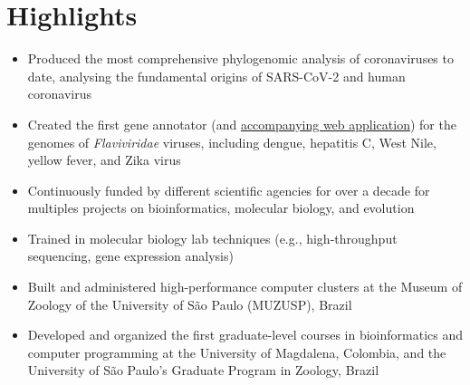 
\vspace{-2.5em}



\section{Highlights}

    \begin{itemize}
        \item Produced the most comprehensive phylogenomic analysis of coronaviruses to date, analysing the fundamental origins of SARS-CoV-2 and human coronavirus
        \item Created the first gene annotator (and \href{http://flavi-web.com/}{accompanying web application}) for the genomes of \textit{Flaviviridae} viruses, including dengue, hepatitis C, West Nile, yellow fever, and Zika virus
        \item Continuously funded by different scientific agencies for over a decade for multiples projects on bioinformatics, molecular biology, and evolution
        \item Trained in molecular biology lab techniques (e.g., high-throughput sequencing, gene expression analysis)
        \item Built and administered high-performance computer clusters at the Museum of Zoology of the University of São Paulo (MUZUSP), Brazil
        \item Developed and organized the first graduate-level courses in bioinformatics and computer programming at the University of Magdalena, Colombia, and the University of São Paulo's Graduate Program in Zoology, Brazil
    \end{itemize}
